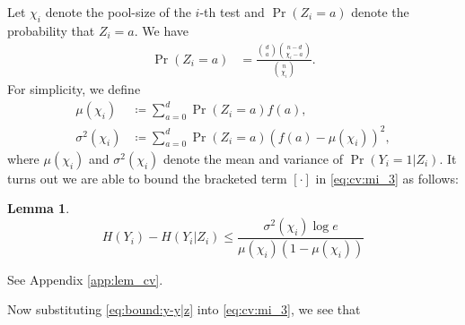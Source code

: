 \documentclass[onecolumn,letterpaper]{IEEEtran}
\newtheorem{lemma}{Lemma}
\newcommand{\cM}{{\boldsymbol{M}}}
\newcommand{\cx}{{X}}
\newcommand{\cy}{{Y}}
\newcommand{\cxh}{{\hat{X}}}
\newcommand{\etp}{{H}}
\newcommand{\mi}{{I}}
\newcommand{\cA}{{Z}}
\newcommand{\mn}{{\chi}}
\newcommand{\na}{{a}}
\newcommand{\plsize}{{\chi}}
\newcommand{\mean}{{\mu}}
\newcommand{\var}{{\sigma^{2}}}
\begin{document}
Let $\plsize_i$ denote the pool-size of the $i$-th test and $\Pr(\cA_i=\na)$ denote the probability that $\cA_i=\na$. We have
\begin{align}
    \Pr(\cA_i=\na) &= \frac{\binom{d}{\na}\binom{n-d}{\plsize_i-\na}}{\binom{n}{\plsize_i}}.
\end{align}
For simplicity, we define
\begin{equation}
\begin{aligned} \label{eq:cv:def:p_miu_v}
    \mean(\plsize_i) &\coloneqq \sum\limits_{\na=0}^{d} \Pr(\cA_i=\na) f(\na), \\
    \var(\plsize_i) &\coloneqq \sum\limits_{\na=0}^{d} \Pr(\cA_i=\na) \left(f(\na)-\mean(\plsize_i)\right)^2,
\end{aligned}
\end{equation}
where $\mean(\plsize_i)$ and $\var(\plsize_i)$ denote the mean and variance of $\Pr(\cy_i=1 | \cA_i)$.
It turns out we are able to bound the bracketed term $[\cdot]$ in \eqref{eq:cv:mi_3} as follows:
\begin{lemma}
\label{lem:cv_H}
\begin{equation}
\label{eq:bound:y-y|z}
\etp(\cy_i) - \etp(\cy_i | \cA_i) \leq \frac{\var(\plsize_i) \log e}{\mean(\plsize_i)(1-\mean(\plsize_i))}
\end{equation}
\end{lemma}
\begin{IEEEproof}
See Appendix \ref{app:lem_cv}.
\end{IEEEproof}
Now substituting \eqref{eq:bound:y-y|z} into \eqref{eq:cv:mi_3}, we see that
\end{document}
